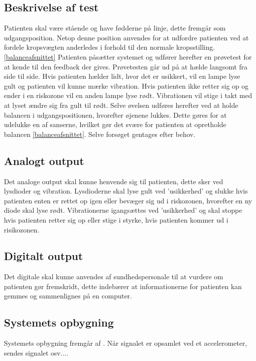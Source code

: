 \subsection{Beskrivelse af test}
Patienten skal være stående og have fødderne på linje, dette fremgår som udgangsposition. Netop denne position anvendes for at udfordre patienten ved at fordele kropsvægten anderledes i forhold til den normale kropsstilling.\ref{balanceafsnittet} Patienten påsætter systemet og udfører herefter en prøvetest for at kende til den feedback der gives. Prøvetesten går ud på at hælde langsomt fra side til side. Hvis patienten hælder lidt, hvor det er usikkert, vil en lampe lyse gult og patienten vil kunne mærke vibration. Hvis patienten ikke retter sig op og ender i en riskozone vil en anden lampe lyse rødt. Vibrationen vil stige i takt med at lyset ændre sig fra gult til rødt. Selve øvelsen udføres herefter ved at holde balancen i udgangspositionen, hvorefter øjenene lukkes. Dette gøres for at udelukke en af sanserne, hvilket gør det svære for patienten at opretholde balancen \ref{balanceafsnittet}. Selve forsøget gentages efter behov.

\subsection{Analogt output}
Det analoge output skal kunne henvende sig til patienten, dette sker ved lysdioder og vibration. Lysdioderne skal lyse gult ved 'usikkerhed' og slukke hvis patienten enten er rettet op igen eller bevæger sig ud i riskozonen, hvorefter en ny diode skal lyse rødt. Vibrationerne igangsættes ved 'usikkerhed' og skal stoppe hvis patienten retter sig op eller stige i styrke, hvis patienten kommer ud i risikozonen. 

\subsection{Digitalt output}
Det digitale skal kunne anvendes af sundhedspersonale til at vurdere om patienten gør fremskridt, dette indebærer at informationerne for patienten kan gemmes og sammenlignes på en computer. 


\subsection{Systemets opbygning}
Systemets opbygning fremgår af . Når signalet er opsamlet ved et accelerometer, sendes signalet osv....

